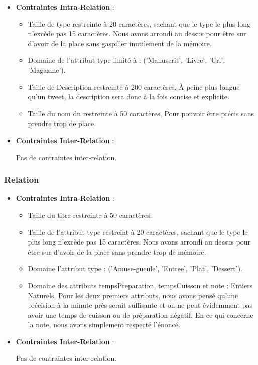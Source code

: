 \documentclass[a4paper,10pt]{report}
\begin{document}
\begin{itemize}
 	
	\item \textbf{Contraintes Intra-Relation} :
	
		\begin{itemize}
			\item Taille de type restreinte à 20 caractères, sachant que le type le plus long n'excède pas 15 caractères. Nous avons arrondi au dessus pour être sur d'avoir de la place sans gaspiller inutilement de la mémoire. 
			\item Domaine de l'attribut type limité à : ('Manuscrit', 'Livre', 'Url', 'Magazine'). 
			\item Taille de Description restreinte à 200 caractères. À peine plus longue qu'un tweet, la description sera donc à la fois concise et explicite. 
			\item Taille du nom du  restreinte à 50 caractères, Pour pouvoir être précis sans prendre trop de place.\\
		 \end{itemize}
 
 	\item  \textbf{Contraintes Inter-Relation} :
 
Pas de contraintes inter-relation.

  
 
 \end{itemize}
	 
 \subsubsection{Relation }
 
  \begin{itemize}
 	
	\item \textbf{Contraintes Intra-Relation} :
	
		\begin{itemize}
			\item Taille du titre restreinte à 50 caractères. 
			\item Taille de l'attribut type restreint à 20 caractères, sachant que le type le plus long n'excède pas 15 caractères. Nous avons arrondi au dessus pour être sur d'avoir de la place sans prendre trop de mémoire.
			\item Domaine l'attribut type : ('Amuse-gueule', 'Entree', 'Plat', 'Dessert'). 
			\item Domaine des attributs tempsPreparation, tempsCuisson et note : Entiers Naturels. Pour les deux premiers attributs, nous avons pensé qu'une précision à la minute près serait suffisante et on ne peut évidemment pas avoir une temps de cuisson ou de préparation négatif. En ce qui concerne la note, nous avons simplement respecté l'énoncé.\\
		 \end{itemize}
  
 	\item  \textbf{Contraintes Inter-Relation} :
 
 
Pas de contraintes inter-relation.

 \end{itemize}
 		
\end{document}
